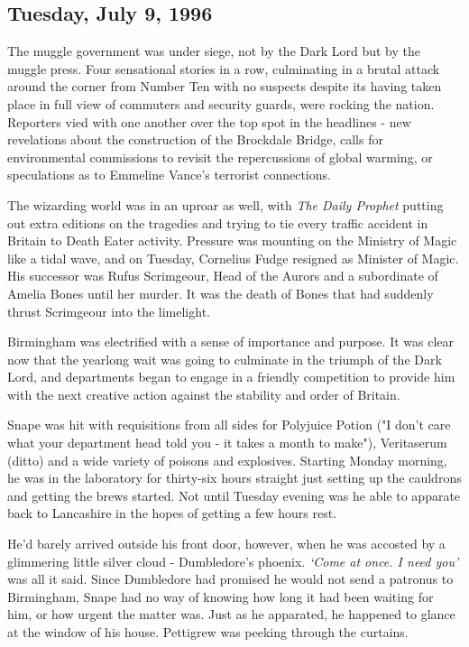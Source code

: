 \subsection{Tuesday, July 9, 1996}

The muggle government was under siege, not by the Dark Lord but by the muggle press. Four sensational stories in a row, culminating in a brutal attack around the corner from Number Ten with no suspects despite its having taken place in full view of commuters and security guards, were rocking the nation. Reporters vied with one another over the top spot in the headlines - new revelations about the construction of the Brockdale Bridge, calls for environmental commissions to revisit the repercussions of global warming, or speculations as to Emmeline Vance's terrorist connections.

The wizarding world was in an uproar as well, with \emph{The Daily Prophet} putting out extra editions on the tragedies and trying to tie every traffic accident in Britain to Death Eater activity. Pressure was mounting on the Ministry of Magic like a tidal wave, and on Tuesday, Cornelius Fudge resigned as Minister of Magic. His successor was Rufus Scrimgeour, Head of the Aurors and a subordinate of Amelia Bones until her murder. It was the death of Bones that had suddenly thrust Scrimgeour into the limelight.

Birmingham was electrified with a sense of importance and purpose. It was clear now that the yearlong wait was going to culminate in the triumph of the Dark Lord, and departments began to engage in a friendly competition to provide him with the next creative action against the stability and order of Britain.

Snape was hit with requisitions from all sides for Polyjuice Potion ("I don't care what your department head told you - it takes a month to make"), Veritaserum (ditto) and a wide variety of poisons and explosives. Starting Monday morning, he was in the laboratory for thirty-six hours straight just setting up the cauldrons and getting the brews started. Not until Tuesday evening was he able to apparate back to Lancashire in the hopes of getting a few hours rest.

He'd barely arrived outside his front door, however, when he was accosted by a glimmering little silver cloud - Dumbledore's phoenix. \emph{`Come at once. I need you'} was all it said. Since Dumbledore had promised he would not send a patronus to Birmingham, Snape had no way of knowing how long it had been waiting for him, or how urgent the matter was. Just as he apparated, he happened to glance at the window of his house. Pettigrew was peeking through the curtains.

